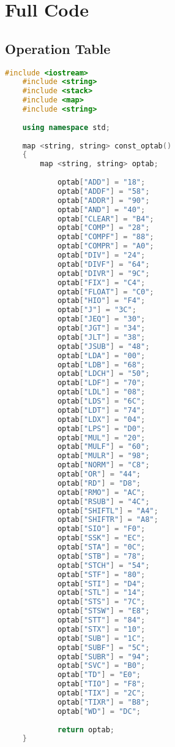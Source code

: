 \documentclass[12pt]{article}
\begin{document}
\newpage
\section{Full Code}

\subsection{Operation Table}
\begin{lstlisting}[language=C++, caption={Operation Table (optab)}]
    #include <iostream>
    #include <string>
    #include <stack>
    #include <map>
    #include <string>
    
    using namespace std;
    
    map <string, string> const_optab()
    {
        map <string, string> optab;
    
            optab["ADD"] = "18";
            optab["ADDF"] = "58";
            optab["ADDR"] = "90";
            optab["AND"] = "40";
            optab["CLEAR"] = "B4";
            optab["COMP"] = "28";
            optab["COMPF"] = "88";
            optab["COMPR"] = "A0";
            optab["DIV"] = "24";
            optab["DIVF"] = "64";
            optab["DIVR"] = "9C";
            optab["FIX"] = "C4";
            optab["FLOAT"] = "C0";
            optab["HIO"] = "F4";
            optab["J"] = "3C";
            optab["JEQ"] = "30";
            optab["JGT"] = "34";
            optab["JLT"] = "38";
            optab["JSUB"] = "48";
            optab["LDA"] = "00";
            optab["LDB"] = "68";
            optab["LDCH"] = "50";
            optab["LDF"] = "70";
            optab["LDL"] = "08";
            optab["LDS"] = "6C";
            optab["LDT"] = "74";
            optab["LDX"] = "04";
            optab["LPS"] = "D0";
            optab["MUL"] = "20";
            optab["MULF"] = "60";
            optab["MULR"] = "98";
            optab["NORM"] = "C8";
            optab["OR"] = "44";
            optab["RD"] = "D8";
            optab["RMO"] = "AC";
            optab["RSUB"] = "4C";
            optab["SHIFTL"] = "A4";
            optab["SHIFTR"] = "A8";
            optab["SIO"] = "F0";
            optab["SSK"] = "EC";
            optab["STA"] = "0C";
            optab["STB"] = "78";
            optab["STCH"] = "54";
            optab["STF"] = "80";
            optab["STI"] = "D4";
            optab["STL"] = "14";
            optab["STS"] = "7C";
            optab["STSW"] = "E8";
            optab["STT"] = "84";
            optab["STX"] = "10";
            optab["SUB"] = "1C";
            optab["SUBF"] = "5C";
            optab["SUBR"] = "94";
            optab["SVC"] = "B0";
            optab["TD"] = "E0";
            optab["TIO"] = "F8";
            optab["TIX"] = "2C";
            optab["TIXR"] = "B8";
            optab["WD"] = "DC";
    
            return optab;
    }
\end{lstlisting}
\end{document}
